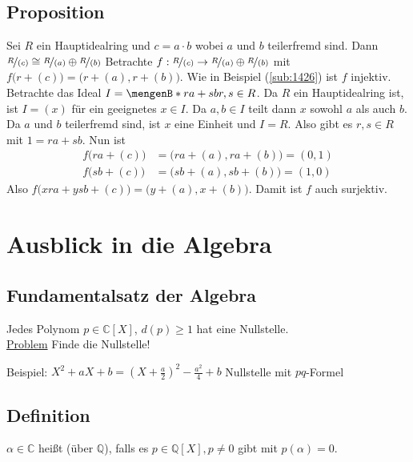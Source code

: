 \subsection{Proposition} %
\label{sub:1427}
Sei $R$ ein Hauptidealring und $c= a \cdot b$ wobei $a$ und $b$ teilerfremd sind. Dann $\nicefrac{R}{(c)} \cong \nicefrac{R}{(a)} \oplus \nicefrac{R}{(b)}$
Betrachte $f : \nicefrac{R}{(c)} \to \nicefrac{R}{(a)} \oplus \nicefrac{R}{(b)}$ mit $f\big(r + (c)\big) = \big( r+ (a), r+ (b)\big)$. Wie in Beispiel (\ref{sub:1426}) ist
$f$ injektiv. Betrachte das Ideal $I = \set[ra + sb]{r,s  \in R} $. Da $R$ ein Hauptidealring ist, ist $I=(x)$ für ein geeignetes $x \in I$. Da $a,b \in I$ teilt dann $x$
sowohl $a$ als auch $b$. Da $a$ und $b$ teilerfremd sind, ist $x$ eine Einheit und $I=R$. Also gibt es $r,s \in R$ mit $1= ra +sb$. Nun ist
\begin{align*}
	f\big(ra +(c)\big) &= \big(ra+ (a) , ra + (b)\big) = (0,1) \\
	f\big(sb+ (c)\big) &= \big( sb + (a), sb+ (b)\big) = (1,0)
\end{align*} 
Also $f\big(xra + ysb + (c)\big) = \big( y+ (a), x +(b)\big)$. Damit ist $f$ auch surjektiv. \bewende







\newpage
\appendix
\section{Ausblick in die Algebra} %
\label{sec:15}

\subsection{Fundamentalsatz der Algebra} %
\label{sub:151}
Jedes Polynom $p \in \mathds{C}[X]$, $d(p)\ge 1$ hat eine Nullstelle. \\
\uline{Problem} Finde die Nullstelle!

Beispiel: $X^2 + aX+ b = (X+ \frac{a}{2} )^2 - \frac{a^2}{4} + b$ Nullstelle mit $pq$-Formel

\subsection{Definition} %
\label{sub:152}
$\alpha \in \mathds{C}$ heißt  (über $\mathds{Q}$), falls es $p \in \mathds{Q}[X], p \not= 0$ gibt mit $p(\alpha)= 0$. 

